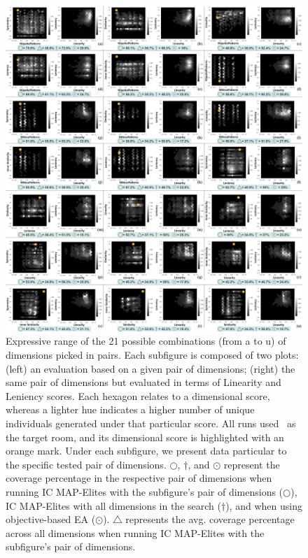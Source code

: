
\begin{figure}[h!]
\centerline{\includegraphics[width=15cm]{figures/figure4.png}}
\caption{Expressive range of the 21 possible combinations (from a to u) of dimensions picked in pairs. Each subfigure is composed of two plots: (left) an evaluation based on a given pair of dimensions; (right) the same pair of dimensions but evaluated in terms of Linearity and Leniency scores. Each hexagon relates to a dimensional score, whereas a lighter hue indicates a higher number of unique individuals generated under that particular score. All runs used~ as the target room, and its dimensional score is highlighted with an orange mark. Under each subfigure, we present data particular to the specific tested pair of dimensions. $\bigcirc$, $\dagger$, and $\odot$ represent the coverage percentage in the respective pair of dimensions when running IC MAP-Elites with the subfigure's pair of dimensions ($\bigcirc$), IC MAP-Elites with all dimensions in the search ($\dagger$), and when using objective-based EA ($\odot$). $\bigtriangleup$ represents the avg. coverage percentage across all dimensions when running IC MAP-Elites with the subfigure's pair of dimensions.
}
\end{figure}
